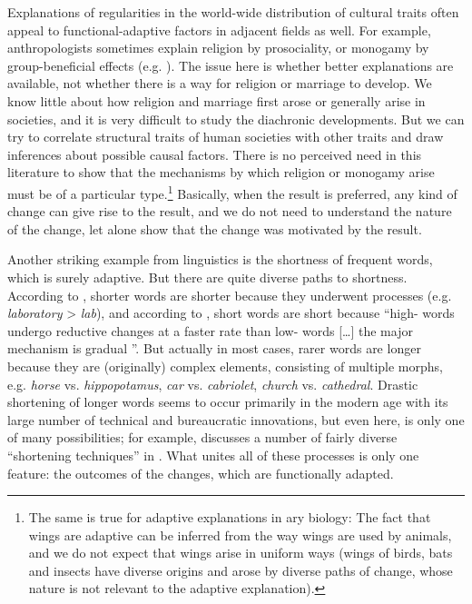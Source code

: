 \documentclass[output=paper]{langsci/langscibook}
\begin{document}
Explanations of regularities in the world-wide distribution of cultural traits often appeal to functional-adaptive factors in adjacent fields as well. For example, anthropologists sometimes explain religion by prosociality, or monogamy by group-beneficial effects (e.g. \citealt{PaciottiEtAl2011,HenrichEtAl2012}). The issue here is whether better explanations are available, not whether there is a way for religion or marriage to develop. We know little about how religion and marriage first arose or generally arise in societies, and it is very difficult to study the diachronic developments. But we can try to correlate structural traits of human societies with other traits and draw inferences about possible causal factors. There is no perceived need in this literature to show that the mechanisms by which religion or monogamy arise must be of a particular type.\footnote{The same is true for adaptive explanations in ary biology: The fact that wings are adaptive can be inferred from the way wings are used by animals, and we do not expect that wings arise in uniform ways (wings of birds, bats and insects have diverse origins and arose by diverse paths of change, whose nature is not relevant to the adaptive explanation).} Basically, when the result is preferred, any kind of change can give rise to the result, and we do not need to understand the nature of the change, let alone show that the change was motivated by the result.

\largerpage
Another striking example from linguistics is the shortness of frequent words, which is surely adaptive. But there are quite diverse paths to shortness. According to \citet{Zipf1935}, shorter words are shorter because they underwent  processes (e.g. \textit{laboratory} > \textit{lab}), and according to \citet[12]{Bybee2007}, short words are short because “high- words undergo reductive changes at a faster rate than low- words […] the major mechanism is gradual ”. But actually in most cases, rarer words are longer because they are (originally) complex elements, consisting of multiple morphs, e.g. \textit{horse} vs. \textit{hippopotamus}, \textit{car} vs. \textit{cabriolet}, \textit{church} vs. \textit{cathedral}. Drastic shortening of longer words seems to occur primarily in the modern age with its large number of technical and bureaucratic innovations, but even here,  is only one of many possibilities; for example, \citet{RonnebergerSibold2014} discusses a number of fairly diverse “shortening techniques” in . What unites all of these processes is only one feature: the outcomes of the changes, which are functionally adapted.
\end{document}
